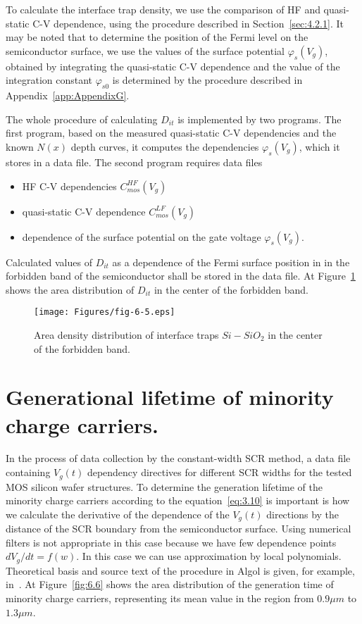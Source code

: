 To calculate the interface trap density, we use the comparison of HF and
quasi-static C-V dependence, using the procedure described in
Section~\ref{sec:4.2.1}. It may be noted that to determine the position of the Fermi
level on the semiconductor surface, we use the values of the surface potential
$\varphi_{s}(V_{g})$, obtained by integrating the quasi-static C-V
dependence and the value of the integration constant $\varphi_{s0}$ is determined
by the procedure described in Appendix~\ref{app:AppendixG}.

The whole procedure of calculating $D_{it}$ is implemented by two
programs. The first program, based on the measured quasi-static C-V
dependencies and the known $N(x)$ depth curves, it computes the
dependencies $\varphi_{s}(V_{g})$, which it stores in a data file. The
second program requires data files

\begin{itemize}
\item HF C-V dependencies $C_{mos}^{HF}(V_{g})$
\item quasi-static C-V dependence $C_{mos}^{LF}(V_{g})$
\item dependence of the surface potential on the gate voltage $\varphi_{s}(V_{g})$.
\end{itemize}

Calculated values of $D_{it}$ as a dependence of the Fermi surface
position in in the forbidden band of the semiconductor shall be stored
in the data file. At Figure~\ref{fig:6.5} shows the area distribution
of $D_{it}$ in the center of the forbidden band.

\begin{figure}[h!]\centering
  \texttt{[image: Figures/fig-6-5.eps]}
  \caption[Area density distribution of $Si-SiO_{2}$ interface traps
    in center of the forbidden band]{Area density distribution of
    interface traps $Si-SiO_{2}$ in the center of the forbidden
    band.}\label{fig:6.5}
\end{figure}

\section{Generational lifetime of minority charge carriers.}\label{sec:6.4}

In the process of data collection by the constant-width SCR method, a
data file containing $V_{g}(t)$ dependency directives for different
SCR widths for the tested MOS silicon wafer structures. To determine
the generation lifetime of the minority charge carriers according to
the equation~\ref{eq:3.10} is important is how we calculate the
derivative of the dependence of the $V_{g}(t)$ directions by the
distance of the SCR boundary from the semiconductor surface. Using
numerical filters is not appropriate in this case because we have few
dependence points $dV_{g}/dt = f(w)$. In this case we can use
approximation by local polynomials. Theoretical basis and source text
of the procedure in Algol is given, for example, in~\cite{6.1}. At
Figure~\ref{fig:6.6} shows the area distribution of the generation
time of minority charge carriers, representing its mean value in the
region from $0.9\mu m$ to $1.3\mu m$.


